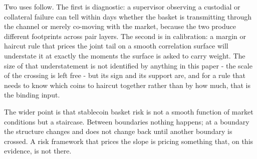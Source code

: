 Two uses follow. The first is diagnostic: a supervisor observing a custodial or collateral failure can tell within days whether the basket is transmitting through the channel or merely co-moving with the market, because the two produce different footprints across pair layers. The second is in calibration: a margin or haircut rule that prices the joint tail on a smooth correlation surface will understate it at exactly the moments the surface is asked to carry weight. The size of that understatement is not identified by anything in this paper - the scale of the crossing is left free - but its sign and its support are, and for a rule that needs to know which coins to haircut together rather than by how much, that is the binding input.

The wider point is that stablecoin basket risk is not a smooth function of market conditions but a staircase. Between boundaries nothing happens; at a boundary the structure changes and does not change back until another boundary is crossed. A risk framework that prices the slope is pricing something that, on this evidence, is not there.
